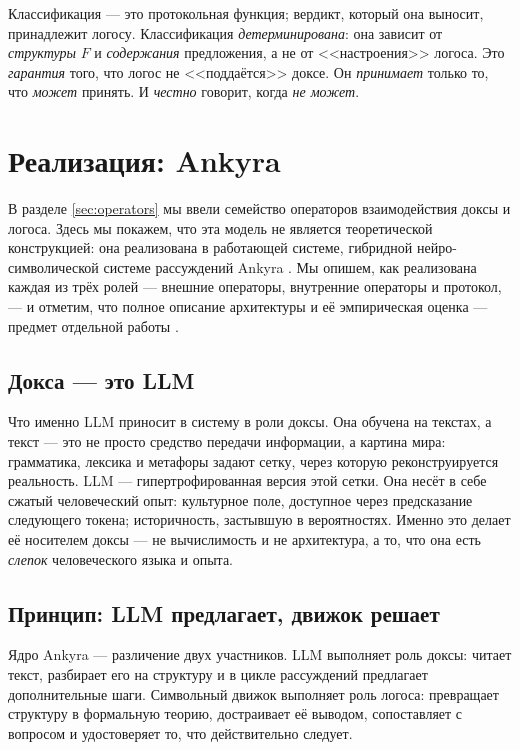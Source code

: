 \documentclass[12pt,a4paper]{article}
\begin{document}
Классификация --- это протокольная функция; вердикт, который она выносит, принадлежит логосу.
Классификация \emph{детерминирована}: она зависит от \emph{структуры} $F$ и \emph{содержания}
предложения, а не от <<настроения>> логоса. Это \emph{гарантия} того, что логос не <<поддаётся>>
доксе. Он \emph{принимает} только то, что \emph{может} принять. И \emph{честно} говорит, когда
\emph{не может}.

\section{Реализация: Ankyra}
\label{sec:implementation}

В разделе \ref{sec:operators} мы ввели семейство операторов взаимодействия доксы и логоса. Здесь мы покажем, что эта модель
не является теоретической конструкцией: она реализована в работающей системе, гибридной нейро-символической
системе рассуждений Ankyra \cite{ankyra}. Мы опишем, как реализована каждая из трёх ролей --- внешние операторы,
внутренние операторы и протокол, --- и отметим, что полное описание архитектуры и её эмпирическая оценка
--- предмет отдельной работы \cite{ankyra_paper}.

\subsection{Докса --- это LLM}
\label{sec:llm_doxa}

Что именно LLM приносит в систему в роли доксы. Она обучена на текстах, а текст ---
это не просто средство передачи информации, а картина мира: грамматика, лексика и
метафоры задают сетку, через которую реконструируется реальность. LLM --- гипертрофированная
версия этой сетки. Она несёт в себе сжатый человеческий опыт: культурное поле,
доступное через предсказание следующего токена; историчность, застывшую в вероятностях.
Именно это делает её носителем доксы --- не вычислимость и не архитектура, а то,
что она есть \emph{слепок} человеческого языка и опыта.

\subsection{Принцип: LLM предлагает, движок решает}
\label{sec:principle}

Ядро Ankyra --- различение двух участников. LLM выполняет роль доксы: читает текст, разбирает его на
структуру и в цикле рассуждений предлагает дополнительные шаги. Символьный движок выполняет роль
логоса: превращает структуру в формальную теорию, достраивает её выводом, сопоставляет с вопросом
и удостоверяет то, что действительно следует.
\end{document}
